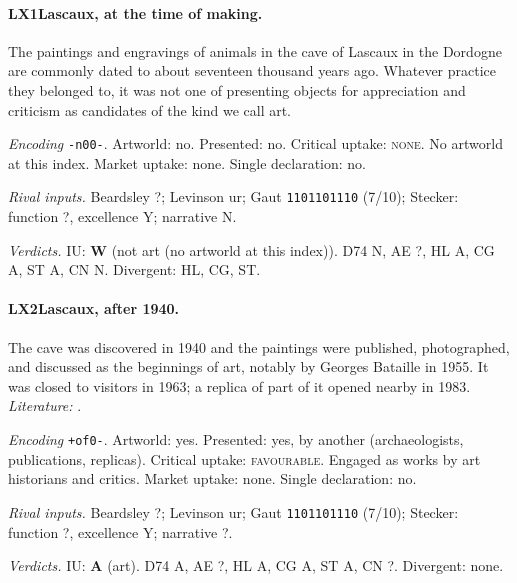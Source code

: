 \paragraph{LX1\enspace Lascaux, at the time of making.}
The paintings and engravings of animals in the cave of Lascaux in the Dordogne are commonly dated to about seventeen thousand years ago. Whatever practice they belonged to, it was not one of presenting objects for appreciation and criticism as candidates of the kind we call art.\par
\noindent\textit{Encoding} \texttt{-n00-}. Artworld: no. Presented: no. Critical uptake: \textsc{none}. No artworld at this index. Market uptake: none. Single declaration: no.\par
\noindent\textit{Rival inputs.} Beardsley ?; Levinson ur; Gaut \texttt{1101101110} (7/10); Stecker: function ?, excellence Y; narrative N.\par
\noindent\textit{Verdicts.} IU: \textbf{W} (not art (no artworld at this index)). D74 N, AE ?, HL A, CG A, ST A, CN N. Divergent: HL, CG, ST.\par

\paragraph{LX2\enspace Lascaux, after 1940.}
The cave was discovered in 1940 and the paintings were published, photographed, and discussed as the beginnings of art, notably by Georges Bataille in 1955. It was closed to visitors in 1963; a replica of part of it opened nearby in 1983. \textit{Literature:} \citet{Bataille1955}.\par
\noindent\textit{Encoding} \texttt{+of0-}. Artworld: yes. Presented: yes, by another (archaeologists, publications, replicas). Critical uptake: \textsc{favourable}. Engaged as works by art historians and critics. Market uptake: none. Single declaration: no.\par
\noindent\textit{Rival inputs.} Beardsley ?; Levinson ur; Gaut \texttt{1101101110} (7/10); Stecker: function ?, excellence Y; narrative ?.\par
\noindent\textit{Verdicts.} IU: \textbf{A} (art). D74 A, AE ?, HL A, CG A, ST A, CN ?. Divergent: none.\par


